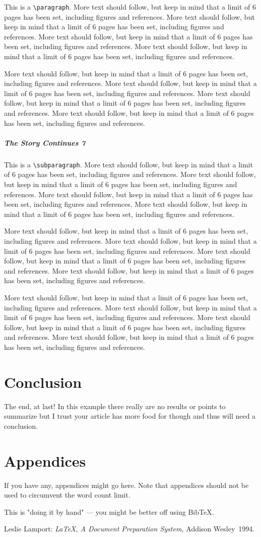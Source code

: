 \documentclass[box,accept]{acmconf}
\def\XX{More text should follow, but keep in mind that a limit of 6
  pages has been set, including figures and references.  More text
  should follow, but keep in mind that a limit of 6 pages has been
  set, including figures and references.  More text should follow, but
  keep in mind that a limit of 6 pages has been set, including figures
  and references.  More text should follow, but keep in mind that a
  limit of 6 pages has been set, including figures and references.
  \par
}
\begin{document}
This is a \verb+\paragraph+.
\XX\XX

\subparagraph{The Story Continues 7}
This is a \verb+\subparagraph+.
\XX\XX\XX

\section{Conclusion}
The end, at last!  In this example there really are no results or
points to summarize but I trust your article has more food for though
and thus will need a conclusion.

\appendix
\section{Appendices}
If you have any, appendices might go here.  Note that appendices
should not be used to circumvent the word count limit.

This is "doing it by hand" --- you might be better off using BibTeX.

\begin{thebibliography}{X}
 Leslie Lamport: {\em \LaTeX, A Document
    Preparation System,} Addison Wesley~1994.
\end{thebibliography}

\IfPrepare{
  \tableofcontents
  \listoffigures
  \listoftables
}{}
\end{document}
